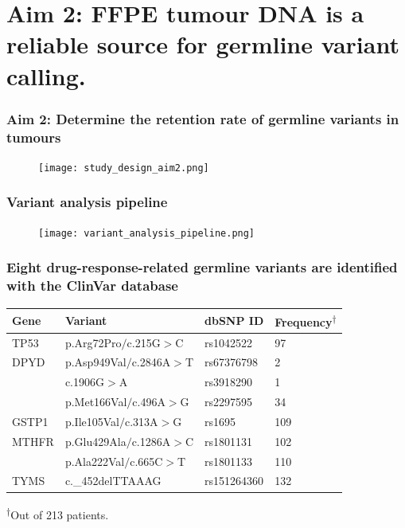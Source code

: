\documentclass{beamer}
\begin{document}
\section[Aim 2]{Aim 2: FFPE tumour DNA is a reliable source for germline variant calling.}

\begin{frame}
\frametitle{Aim 2: Determine the retention rate of germline variants in tumours}
\centering
\begin{figure}[t]
    \texttt{[image: study\_design\_aim2.png]}
\end{figure}
\end{frame}

\begin{frame}
\frametitle{Variant analysis pipeline}
\centering
\begin{figure}[t]
    \texttt{[image: variant\_analysis\_pipeline.png]}
\end{figure}
\end{frame}

\begin{frame}
\frametitle{Eight drug-response-related germline variants are identified with the ClinVar database}
\centering
\begin{table}
\centering
      \begin{tabular}{l|lll}
      \hline
      Gene & Variant & dbSNP ID & Frequency\textsuperscript{$\dagger$}
      \\
      \hline
      TP53 & p.Arg72Pro$/$c.215G$>$C & rs1042522 & 97
      \\
      DPYD & p.Asp949Val$/$c.2846A$>$T & rs67376798 & 2
      \\
       & c.1906G$>$A & rs3918290 & 1
      \\
       & p.Met166Val$/$c.496A$>$G & rs2297595 & 34
      \\
      GSTP1 & p.Ile105Val$/$c.313A$>$G & rs1695 & 109
      \\
      MTHFR & p.Glu429Ala$/$c.1286A$>$C & rs1801131 & 102
      \\
       & p.Ala222Val$/$c.665C$>$T & rs1801133 & 110
      \\
      TYMS & c.\*447\_\*452delTTAAAG & rs151264360 & 132
      \\
      \hline
      \end{tabular}
    \end{table}
    \footnotesize\textsuperscript{$\dagger$}Out of 213 patients.
\end{frame}
\end{document}
